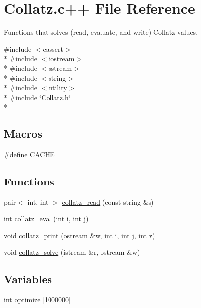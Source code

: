 \hypertarget{Collatz_8c_09_09}{\section{Collatz.\-c++ File Reference}
\label{Collatz_8c_09_09}
}


Functions that solves (read, evaluate, and write) Collatz values.  


{\ttfamily \#include $<$cassert$>$}\\*
{\ttfamily \#include $<$iostream$>$}\\*
{\ttfamily \#include $<$sstream$>$}\\*
{\ttfamily \#include $<$string$>$}\\*
{\ttfamily \#include $<$utility$>$}\\*
{\ttfamily \#include \char`\"{}Collatz.\-h\char`\"{}}\\*
\subsection*{Macros}
\begin{DoxyCompactItemize}
\item 
\#define \hyperlink{Collatz_8c_09_09_a43fd55aa78bd891ebbd6a450f5eecce4}{C\-A\-C\-H\-E}
\end{DoxyCompactItemize}
\subsection*{Functions}
\begin{DoxyCompactItemize}
\item 
pair$<$ int, int $>$ \hyperlink{Collatz_8c_09_09_a2772f8a734aeab48332eb3b282f991ba}{collatz\-\_\-read} (const string \&s)
\item 
int \hyperlink{Collatz_8c_09_09_a0b0d3827a619c18aa4d96b8ee8b1c47d}{collatz\-\_\-eval} (int i, int j)
\item 
void \hyperlink{Collatz_8c_09_09_aeda0b7ea3e40e1e7487ccc436f33a559}{collatz\-\_\-print} (ostream \&w, int i, int j, int v)
\item 
void \hyperlink{Collatz_8c_09_09_a0ac646d2122741f9a9a52201bf9551cc}{collatz\-\_\-solve} (istream \&r, ostream \&w)
\end{DoxyCompactItemize}
\subsection*{Variables}
\begin{DoxyCompactItemize}
\item 
int \hyperlink{Collatz_8c_09_09_a1ef8937739e2b89b534c4ab7469e0629}{optimize} \mbox{[}1000000\mbox{]}
\end{DoxyCompactItemize}


